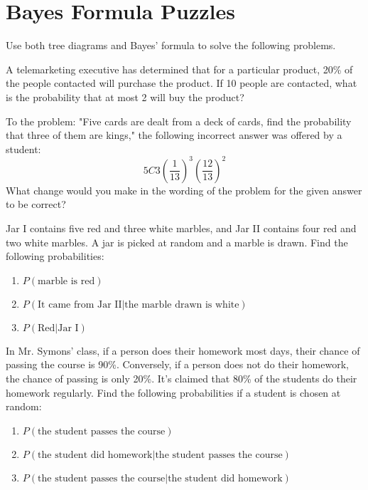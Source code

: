 \section{Bayes Formula Puzzles}

Use both tree diagrams and Bayes' formula to solve the following problems.

\begin{puzzle}
    A telemarketing executive has determined that for a particular product, 20\% of the people contacted will purchase the product. If 10 people are contacted, what is the probability that at most 2 will buy the product?
\end{puzzle}

\begin{puzzle}
    To the problem: "Five cards are dealt from a deck of cards, find the probability that three of them are kings," the following incorrect answer was offered by a student: \[ 5C3 \left(\frac{1}{13}\right)^3 \left(\frac{12}{13}\right)^2 \]
    What change would you make in the wording of the problem for the given answer to be correct?
\end{puzzle}

\begin{puzzle}
    Jar I contains five red and three white marbles, and Jar II contains four red and two white marbles. A jar is picked at random and a marble is drawn. Find the following probabilities:
    \begin{enumerate}
        \item \( P(\text{marble is red}) \)
        \item \( P(\text{It came from Jar II} | \text{the marble drawn is white}) \)
        \item \( P(\text{Red} | \text{Jar I}) \)
    \end{enumerate}
\end{puzzle}

\begin{puzzle}
    In Mr. Symons' class, if a person does their homework most days, their chance of passing the course is 90\%. Conversely, if a person does not do their homework, the chance of passing is only 20\%. It's claimed that 80\% of the students do their homework regularly. Find the following probabilities if a student is chosen at random:
    \begin{enumerate}
        \item \( P(\text{the student passes the course}) \)
        \item \( P(\text{the student did homework} | \text{the student passes the course}) \)
        \item \( P(\text{the student passes the course} | \text{the student did homework}) \)
    \end{enumerate}
\end{puzzle}

